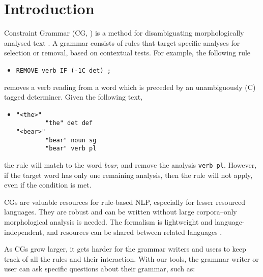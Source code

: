 \section{Introduction}
\label{sec:intro}

Constraint Grammar (CG, \cite{karlsson1995constraint})
is a method for disambiguating morphologically analysed text
. 
A grammar consists of rules that target specific analyses for selection or removal, based on contextual tests. For example, the following rule
\begin{itemize}
\item[] \texttt{REMOVE verb IF (-1C det) ;}
\end{itemize}
removes a verb reading from a word which is preceded by an unambiguously (C) tagged determiner.
Given the following text,
\begin{itemize}
\item[] 
\begin{verbatim}
"<the>"
        "the" det def
"<bear>"
        "bear" noun sg
        "bear" verb pl
\end{verbatim}
\end{itemize}
the rule will match to the word \emph{bear}, and remove the analysis \texttt{verb pl}.
However, if the target word has only one remaining analysis, then the rule will not apply, even if the condition is met.

CGs are valuable resources for rule-based NLP, especially for lesser resourced languages. They are robust and can be written without large corpora--only morphological analysis is needed. The formalism is lightweight and language-independent, and resources can be shared between related languages \cite{bick2006spanish,lene_trond_linda2010}.

As CGs grow larger, it gets harder for the grammar writers and users to keep track of all the rules and their interaction.
With our tools, the grammar writer or user can ask specific questions about their grammar, such as:


